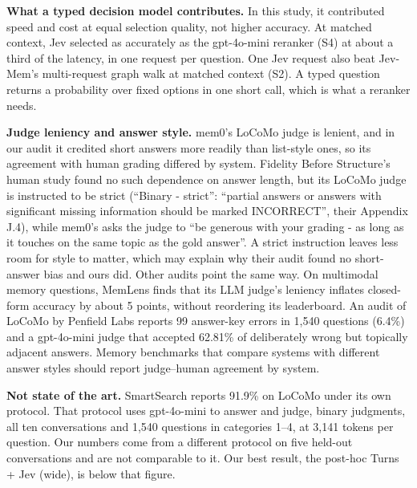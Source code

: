 \documentclass[11pt]{article}
\newcommand{\src}[1]{}
\begin{document}
\textbf{What a typed decision model contributes.} In this study, it contributed speed and cost at equal selection quality, not higher accuracy. At matched context, Jev selected as accurately as the gpt-4o-mini reranker (S4) at about a third of the latency, in one request per question. One Jev request also beat Jev-Mem's multi-request graph walk at matched context (S2). A typed question returns a probability over fixed options in one short call, which is what a reranker needs.

\textbf{Judge leniency and answer style.} mem0's LoCoMo judge is lenient, and in our audit it credited short answers more readily than list-style ones, so its agreement with human grading differed by system. Fidelity Before Structure's human study found no such dependence on answer length, but its LoCoMo judge is instructed to be strict (``Binary - strict'': ``partial answers or answers with significant missing information should be marked INCORRECT'', their Appendix J.4), while mem0's asks the judge to ``be generous with your grading - as long as it touches on the same topic as the gold answer''. A strict instruction leaves less room for style to matter, which may explain why their audit found no short-answer bias and ours did. Other audits point the same way. On multimodal memory questions, MemLens \citep{ren2026memlens} finds that its LLM judge's leniency inflates closed-form accuracy by about 5\src{cite:ren2026memlens (checked against the paper's text; paper\_v3/bib\_verification.md)} points, without reordering its leaderboard. An audit of LoCoMo by Penfield Labs \citep{penfield2026locomo} reports 99\src{cite:penfield2026locomo (checked against the paper's text; paper\_v3/bib\_verification.md)} answer-key errors in 1,540\src{cite:penfield2026locomo (checked against the paper's text; paper\_v3/bib\_verification.md)} questions (6.4\src{cite:penfield2026locomo (checked against the paper's text; paper\_v3/bib\_verification.md)}\%) and a gpt-4o-mini judge that accepted 62.81\src{cite:penfield2026locomo (checked against the paper's text; paper\_v3/bib\_verification.md)}\% of deliberately wrong but topically adjacent answers. Memory benchmarks that compare systems with different answer styles should report judge--human agreement by system.

\textbf{Not state of the art.} SmartSearch reports 91.9\src{cite:derehag2026smartsearch (checked against the paper's text; paper\_v3/bib\_verification.md)}\% on LoCoMo under its own protocol. That protocol uses gpt-4o-mini to answer and judge, binary judgments, all ten conversations and 1,540\src{cite:derehag2026smartsearch (checked against the paper's text; paper\_v3/bib\_verification.md)} questions in categories 1--4, at 3,141\src{cite:derehag2026smartsearch (checked against the paper's text; paper\_v3/bib\_verification.md)} tokens per question. Our numbers come from a different protocol on five held-out conversations and are not comparable to it. Our best result, the post-hoc Turns + Jev (wide), is below that figure.
\end{document}
